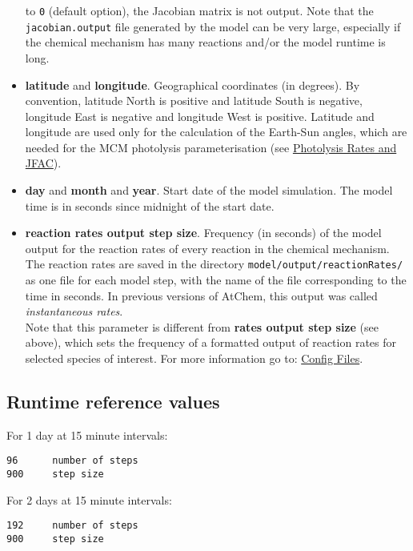 \begin{itemize}
  to \texttt{0} (default option), the Jacobian matrix is not
  output. Note that the \texttt{jacobian.output} file generated by the
  model can be very large, especially if the chemical mechanism has
  many reactions and/or the model runtime is long.
\item \textbf{latitude} and \textbf{longitude}. Geographical
  coordinates (in degrees). By convention, latitude North is positive
  and latitude South is negative, longitude East is negative and
  longitude West is positive. Latitude and longitude are used only for
  the calculation of the Earth-Sun angles, which are needed for the
  MCM photolysis parameterisation (see
  \hyperref[sec:photolysis]{Photolysis Rates and JFAC}).
\item \textbf{day} and \textbf{month} and \textbf{year}. Start date of
  the model simulation. The model time is in seconds since midnight of
  the start date.
\item \textbf{reaction rates output step size}. Frequency (in seconds)
  of the model output for the reaction rates of every reaction in the
  chemical mechanism. The reaction rates are saved in the directory
  \texttt{model/output/reactionRates/} as one file for each model
  step, with the name of the file corresponding to the time in
  seconds. In previous versions of AtChem, this output was called
  \emph{instantaneous rates}.\\ Note that this parameter is different
  from \textbf{rates output step size} (see above), which sets the
  frequency of a formatted output of reaction rates for selected
  species of interest. For more information go to:
  \hyperref[sec:config]{Config Files}.
\end{itemize}

\subsection{Runtime reference values} \label{subsec:runtime-reference-values}

For 1 day at 15 minute intervals:

\begin{verbatim}
96      number of steps
900     step size
\end{verbatim}

For 2 days at 15 minute intervals:

\begin{verbatim}
192     number of steps
900     step size
\end{verbatim}

